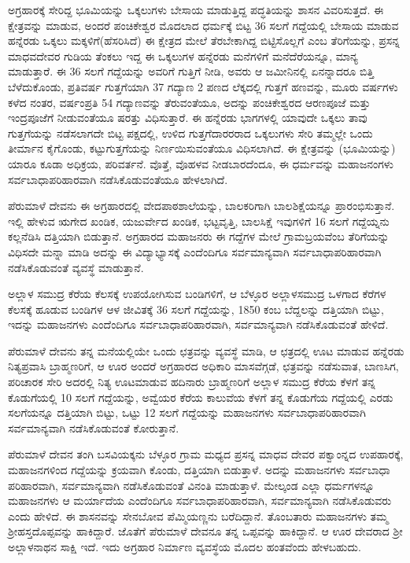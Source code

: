 ಅಗ್ರಹಾರಕ್ಕೆ ಸೇರಿದ್ದ ಭೂಮಿಯನ್ನು ಒಕ್ಕಲುಗಳು ಬೇಸಾಯ ಮಾಡುತ್ತಿದ್ದ ಪದ್ಧತಿಯನ್ನು ಶಾಸನ ವಿವರಿಸುತ್ತದೆ. ಈ ಕ್ಷೇತ್ರವನ್ನು ಮಾಡುವ, ಅಂದರೆ ಪಂಚಿಕೇಶ್ವರ ಮೊದಲಾದ ಧರ್ಮಕ್ಕೆ ಬಿಟ್ಟ 36 ಸಲಗೆ ಗದ್ದೆಯಲ್ಲಿ ಬೇಸಾಯ ಮಾಡುವ ಹನ್ನೆರಡು ಒಕ್ಕಲು ಮಕ್ಕಳಿಗೆ(ಹೆಸರಿಸಿದೆ) ಈ ಕ್ಷೇತ್ರದ ಮೇಲೆ ತೆರಬೇಕಾಗಿದ್ದ ಬಿಟ್ಟಿಸೊಲ್ಲಗೆ ಎಂಬ ತೆರಿಗೆಯನ್ನು, ಪ್ರಸನ್ನ ಮಾಧವದೇವರ ಗುಡಿಯ ತೆಂಕಲು ಇದ್ದ ಈ ಒಕ್ಕಲುಗಳ ಹನ್ನೆರಡು ಮನೆಗಳಿಗೆ ಮನೆದೆರೆಯನ್ನೂ, ಮಾನ್ಯ ಮಾಡುತ್ತಾರೆ. ಈ 36 ಸಲಗೆ ಗದ್ದೆಯನ್ನು ಅವರಿಗೆ ಗುತ್ತಿಗೆ ನೀಡಿ, ಅವರು ಆ ಜಮೀನಿನಲ್ಲಿ ಏನನ್ನಾದರೂ ಬಿತ್ತಿ ಬೆಳೆದುಕೊಂಡು, ಪ್ರತಿವರ್ಷ ಗುತ್ತಗೆಯಾಗಿ 37 ಗದ್ಯಾಣ 2 ಪಣದ ಲೆಕ್ಕದಲ್ಲಿ ಗುತ್ತಗೆ ಹಣವನ್ನು, ಮೂರು ವರ್ಷಗಳು ಕಳೆದ ನಂತರ, ವರ್ಷಂಪ್ರತಿ 54 ಗದ್ಯಾಣವನ್ನು ತೆರುವಂತೆಯೂ, ಅದನ್ನು ಪಂಚಿಕೇಶ್ವರದ ಆರಣಪೂಜೆ ಮತ್ತು ಇಂದ್ರಪೂಜೆಗೆ ನೀಡುವಂತೆಯೂ ಷರತ್ತು ವಿಧಿಸುತ್ತಾರೆ. ಈ ಹನ್ನೆರಡು ಭಾಗಗಳಲ್ಲಿ ಯಾವುದೇ ಒಕ್ಕಲು ತಾವು ಗುತ್ತಗೆಯನ್ನು ನಡೆಸಲಾಗದೇ ಬಿಟ್ಟ ಪಕ್ಷದಲ್ಲಿ, ಉಳಿದ ಗುತ್ತಗೆದಾರರರಾದ ಒಕ್ಕಲುಗಳು ಸೇರಿ ತಮ್ಮಲ್ಲೇ ಒಂದು ತೀರ್ಮಾನ ಕೈಗೊಂಡು, ಕಟ್ಟುಗುತ್ತಗೆಯನ್ನು ನಿರ್ಣಯಿಸುವಂತೆಯೂ ವಿಧಿಸಲಾಗಿದೆ. ಈ ಕ್ಷೇತ್ರವನ್ನು (ಭೂಮಿಯನ್ನು) ಯಾರೂ ಕೂಡಾ ಅಧಿಕ್ರಯ, ಪರಿವರ್ತನೆ. ವೊತ್ತೆ, ವೊಹಳವ ನೀಡಬಾರದೆಂದೂ, ಈ ಧರ್ಮವನ್ನು ಮಹಾಜನಂಗಳು ಸರ್ವಬಾಧಾಪರಿಹಾರವಾಗಿ ನಡೆಸಿಕೊಡುವಂತೆಯೂ ಹೇಳಲಾಗಿದೆ.

ಪೆರುಮಾಳೆ ದೇವನು ಈ ಅಗ್ರಹಾರದಲ್ಲಿ ವೇದಪಾಠಶಾಲೆಯನ್ನು, ಬಾಲಕರಿಗಾಗಿ ಬಾಲಶಿಕ್ಷೆಯನ್ನೂ ಪ್ರಾರಂಭಿಸುತ್ತಾನೆ. ಇಲ್ಲಿ ಹೇಳುವ ಋಗೇದ ಖಂಡಿಕ, ಯಜುರ್ವೇದ ಖಂಡಿಕ, ಭಟ್ಟವೃತ್ತಿ, ಬಾಲಸಿಕ್ಷೆ ಇವುಗಳಿಗೆ 16 ಸಲಗೆ ಗದ್ದೆಯ್ನನು ಕಲ್ಲನೆಡಿಸಿ ದತ್ತಿಯಾಗಿ ಬಿಡುತ್ತಾನೆ. ಅಗ್ರಹಾರದ ಮಹಾಜನರು ಈ ಗದ್ದೆಗಳ ಮೇಲೆ ಗ್ರಾಮಬ್ರಯವೆಂಬ ತೆರಿಗೆಯನ್ನು ವಿಧಿಸದೇ ಮನ್ನಾ ಮಾಡಿ ಅದನ್ನು ಈ ವಿದ್ಯಾಭ್ಯಾಸಕ್ಕೆ ಎಂದೆಂದಿಗೂ ಸರ್ವಮಾನ್ಯವಾಗಿ ಸರ್ವಬಾಧಾಪರಿಹಾರವಾಗಿ ನಡೆಸಿಕೊಡುವಂತೆ ವ್ಯವಸ್ಥೆ ಮಾಡುತ್ತಾನೆ.

ಅಲ್ಲಾಳ ಸಮುದ್ರ ಕೆರೆಯ ಕೆಲಸಕ್ಕೆ ಉಪಯೋಗಿಸುವ ಬಂಡಿಗಳಿಗೆ, ಆ ಬೆಳ್ಳೂರ ಅಲ್ಲಾಳಸಮುದ್ರ ಒಳಗಾದ ಕೆರೆಗಳ ಕೆಲಸಕ್ಕೆ ಹೂಡುವ ಬಂಡಿಗಳ ಆಳ ಜೀವಿತಕ್ಕೆ 36 ಸಲಗೆ ಗದ್ದೆಯನ್ನು, 1850 ಕಂಬ ಬೆದ್ದಲನ್ನು ದತ್ತಿಯಾಗಿ ಬಿಟ್ಟು, ಇದನ್ನು ಮಹಾಜನಗಳು ಎಂದೆಂದಿಗೂ ಸರ್ವಬಾಧಾಪರಿಹಾರವಾಗಿ, ಸರ್ವಮಾನ್ಯವಾಗಿ ನಡೆಸಿಕೊಡುವಂತೆ ಹೇಳಿದೆ.

ಪೆರುಮಾಳೆ ದೇವನು ತನ್ನ ಮನೆಯಲ್ಲಿಯೇ ಒಂದು ಛತ್ರವನ್ನು ವ್ಯವಸ್ಥೆ ಮಾಡಿ, ಆ ಛತ್ರದಲ್ಲಿ ಊಟ ಮಾಡುವ ಹನ್ನೆರಡು ನಿತ್ಯಪ್ರವಾಸಿ ಬ್ರಾಹ್ಮಣರಿಗೆ, ಆ ಊರ ಅಂದರೆ ಅಗ್ರಹಾರದ ಅಧಿಕಾರಿ ಮಾಸವೆಗ್ಗಡೆ, ಛತ್ರವನ್ನು ನಡೆಸುವಾತ, ಬಾಣಸಿಗ, ಪರಿಚಾರಕ ಸೇರಿ ಅದರಲ್ಲಿ ನಿತ್ಯ ಊಟಮಾಡುವ ಹದಿನಾರು ಬ್ರಾಹ್ಮಣರಿಗೆ ಅಲ್ಲಾಳ ಸಮುದ್ರ ಕೆರೆಯ ಕೆಳಗೆ ತನ್ನ ಕೊಡುಗೆಯಲ್ಲಿ 10 ಸಲಗೆ ಗದ್ದೆಯನ್ನು, ಅವ್ವೆಯರ ಕೆರೆಯ ಕಾಲುವೆಯ ಕೆಳಗೆ ತನ್ನ ಕೊಡುಗೆಯ ಗದ್ದೆಯಲ್ಲಿ ಎರಡು ಸಲಗೆಯನ್ನೂ ದತ್ತಿಯಾಗಿ ಬಿಟ್ಟು, ಒಟ್ಟು 12 ಸಲಗೆ ಗದ್ದೆಯನ್ನು ಮಹಾಜನಗಳು ಸರ್ವಬಾಧಾಪರಿಹಾರವಾಗಿ ಸರ್ವಮಾನ್ಯವಾಗಿ ನಡೆಸಿಕೊಡುವಂತೆ ಕೋರುತ್ತಾನೆ.

ಪೆರುಮಾಳೆ ದೇವನ ತಂಗಿ ಬಸವಿಯಕ್ಕನು ಬೆಳ್ಳೂರ ಗ್ರಾಮ ಮಧ್ಯದ ಪ್ರಸನ್ನ ಮಾಧವ ದೇವರ ಪಕ್ವಾಂನ್ನದ ಉಪಹಾರಕ್ಕೆ, ಮಹಾಜನಗಳಿಂದ ಗದ್ದೆಯನ್ನು ಕ್ರಯವಾಗಿ ಕೊಂಡು, ದತ್ತಿಯಾಗಿ ಬಿಡುತ್ತಾಳೆ. ಅದನ್ನು ಮಹಾಜನಗಳು ಸರ್ವಬಾಧಾ ಪರಿಹಾರವಾಗಿ, ಸರ್ವಮಾನ್ಯವಾಗಿ ನಡೆಸಿಕೊಡುವಂತೆ ವಿನಂತಿ ಮಾಡುತ್ತಾಳೆ. ಮೇಲ್ಕಂಡ ಎಲ್ಲಾ ಧರ್ಮಗಳನ್ನೂ ಮಹಾಜನಗಳು ಆ ಮರ್ಯಾದೆಯ ಎಂದೆಂದಿಗೂ ಸರ್ವಬಾಧಾಪರಿಹಾರವಾಗಿ, ಸರ್ವಮಾನ್ಯವಾಗಿ ನಡೆಸಿಕೊಡುವರು ಎಂದು ಹೇಳಿದೆ. ಈ ಶಾಸನವನ್ನು ಸೇನಬೋವ ಪೆಮ್ಮಿಯಣ್ಣನು ಬರೆದಿದ್ದಾನೆ. ತೊಂಬತಾರು ಮಹಾಜನಗಳು ತಮ್ಮ ಶ‍್ರೀಹಸ್ತದೊಪ್ಪವನ್ನು ಹಾಕಿದ್ದಾರೆ. ಜೊತೆಗೆ ಪೆರುಮಾಳೆ ದೇವನೂ ತನ್ನ ಒಪ್ಪವನ್ನು ಹಾಕಿದ್ದಾನೆ. ಆ ಊರ ದೇವರಾದ ಶ‍್ರೀ ಅಲ್ಲಾಳನಾಥನ ಸಾಕ್ಷಿ ಇದೆ. ಇದು ಅಗ್ರಹಾರ ನಿರ್ಮಾಣ ವ್ಯವಸ್ಥೆಯ ಮೊದಲ ಹಂತವೆಂದು ಹೇಳಬಹುದು.

